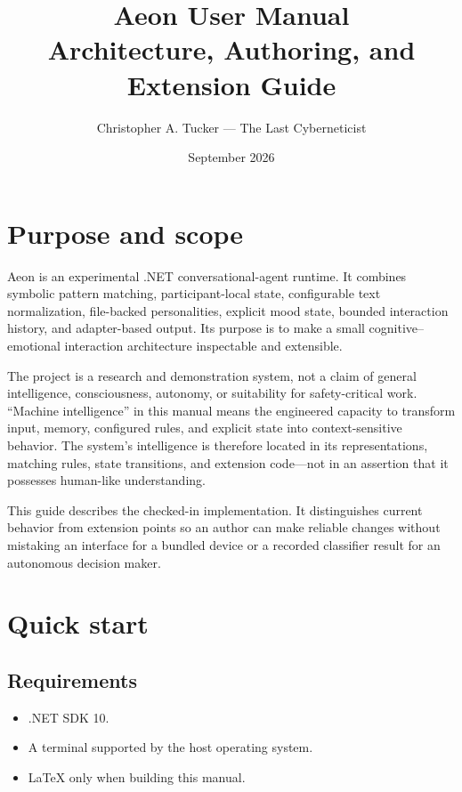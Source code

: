 \documentclass[11pt,a4paper]{article}
\title{\textbf{Aeon User Manual}\\\large Architecture, Authoring, and Extension Guide}
\author{Christopher A. Tucker --- The Last Cyberneticist}
\date{September 2026}
\begin{document}
\setlength{\emergencystretch}{3em}
\maketitle
\tableofcontents
\newpage

\section{Purpose and scope}

Aeon is an experimental .NET conversational-agent runtime. It combines symbolic pattern matching, participant-local state, configurable text normalization, file-backed personalities, explicit mood state, bounded interaction history, and adapter-based output. Its purpose is to make a small cognitive--emotional interaction architecture inspectable and extensible.

The project is a research and demonstration system, not a claim of general intelligence, consciousness, autonomy, or suitability for safety-critical work. ``Machine intelligence'' in this manual means the engineered capacity to transform input, memory, configured rules, and explicit state into context-sensitive behavior. The system's intelligence is therefore located in its representations, matching rules, state transitions, and extension code---not in an assertion that it possesses human-like understanding.

This guide describes the checked-in implementation. It distinguishes current behavior from extension points so an author can make reliable changes without mistaking an interface for a bundled device or a recorded classifier result for an autonomous decision maker.

\section{Quick start}

\subsection{Requirements}

\begin{itemize}
  \item .NET SDK 10.
  \item A terminal supported by the host operating system.
  \item \LaTeX{} only when building this manual.
\end{itemize}
\end{document}
